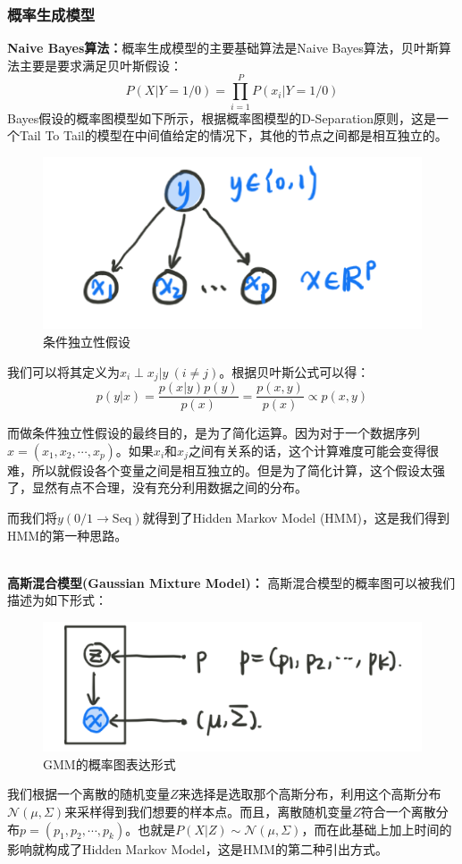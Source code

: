 \documentclass[a4paper]{article}
\begin{document}
\subsubsection{概率生成模型}
\noindent \textbf{Naive Bayes算法：}概率生成模型的主要基础算法是Naive Bayes算法，贝叶斯算法主要是要求满足贝叶斯假设：
$$
P(X|Y=1/0) = \prod_{i=1}^P P(x_i|Y=1/0)
$$
Bayes假设的概率图模型如下所示，根据概率图模型的D-Separation原则，这是一个Tail To Tail的模型在中间值给定的情况下，其他的节点之间都是相互独立的。
\begin{figure}[H]
    \centering
    \includegraphics[width=.45\textwidth]{微信图片_20191104091918.png}
    \caption{条件独立性假设}
    \label{fig:my_label_1}
\end{figure}
\noindent 我们可以将其定义为$x_i\perp x_j|y\ (i \neq j)$。根据贝叶斯公式可以得：
\begin{equation}
    p(y|x)=\frac{p(x|y)p(y)}{p(x)}=\frac{p(x,y)}{p(x)}\propto p(x,y)
\end{equation}

而做条件独立性假设的最终目的，是为了简化运算。因为对于一个数据序列$x=(x_1,x_2,\cdots,x_p)$。如果$x_i$和$x_j$之间有关系的话，这个计算难度可能会变得很难，所以就假设各个变量之间是相互独立的。但是为了简化计算，这个假设太强了，显然有点不合理，没有充分利用数据之间的分布。

而我们将$y(0/1\rightarrow \mathrm{Seq})$就得到了Hidden Markov Model (HMM)，这是我们得到HMM的第一种思路。

~\\
\noindent \textbf{高斯混合模型(Gaussian Mixture Model)：}
高斯混合模型的概率图可以被我们描述为如下形式：
\begin{figure}[H]
    \centering
    \includegraphics[width=.45\textwidth]{微信图片_20191223234640.png}
    \caption{GMM的概率图表达形式}
    \label{fig:my_label_1}
\end{figure}
我们根据一个离散的随机变量$Z$来选择是选取那个高斯分布，利用这个高斯分布$\mathcal{N}(\mu,\Sigma)$来采样得到我们想要的样本点。而且，离散随机变量$Z$符合一个离散分布$p = (p_1,p_2,\cdots,p_k)$。也就是$P(X|Z)\sim \mathcal{N}(\mu,\Sigma)$，而在此基础上加上时间的影响就构成了Hidden Markov Model，这是HMM的第二种引出方式。
\end{document}

